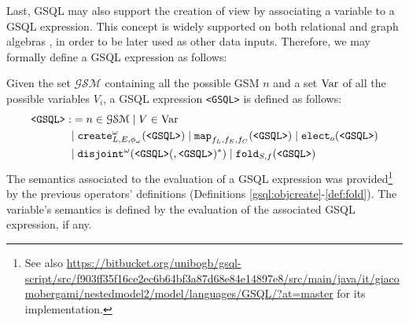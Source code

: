  Last, GSQL may also support the creation of view by associating a variable to a GSQL expression. This concept is widely supported on both relational \cite{Calders2006,atzeniEN,atzeniIT} and graph algebras \cite{GRAD}, in order to be later used as other data inputs. Therefore, we may formally define a GSQL expression as follows:

\begin{definition}
Given the set  $\mathcal{GSM}$ containing all the possible GSM $n$ and a set $\textup{Var}$ of all the possible variables $V_i$, a GSQL expression \texttt{<GSQL>} is defined as follows:
\[\begin{split}
\texttt{<GSQL>}:&=n\in\mathcal{GSM}\;|\;V\in\textup{Var}\\
	&|\;\texttt{create}^\omega_{L,E,\phi_\omega}(\texttt{<GSQL>})\;|\;\texttt{map}_{f_L,f_E,f_C}(\texttt{<GSQL>})\;|\;\texttt{elect}_o(\texttt{<GSQL>})\\
	&|\;\texttt{disjoint}^\omega(\texttt{<GSQL>}(,\texttt{<GSQL>})^*)\;|\;\texttt{fold}_{S,f}(\texttt{<GSQL>})\\
\end{split}\]
The semantics associated to the evaluation of a GSQL expression was provided\footnote{See also \url{https://bitbucket.org/unibogb/gsql-script/src/f903ff35f16ce2ec6b64bf3a87d68e84e14897e8/src/main/java/it/giacomobergami/nestedmodel2/model/languages/GSQL/?at=master} for its implementation.} by the previous operators' definitions (Definitions \ref{gsql:objcreate}-\ref{def:fold}). The variable's semantics is defined by the evaluation of the associated GSQL expression, if any.
\end{definition}

